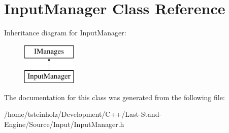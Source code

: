 \hypertarget{classInputManager}{}\section{Input\+Manager Class Reference}
\label{classInputManager}
Inheritance diagram for Input\+Manager\+:\begin{figure}[H]
\begin{center}
\leavevmode
\includegraphics[height=2.000000cm]{classInputManager}
\end{center}
\end{figure}


The documentation for this class was generated from the following file\+:\begin{DoxyCompactItemize}
\item 
/home/tsteinholz/\+Development/\+C++/\+Last-\/\+Stand-\/\+Engine/\+Source/\+Input/Input\+Manager.\+h\end{DoxyCompactItemize}
